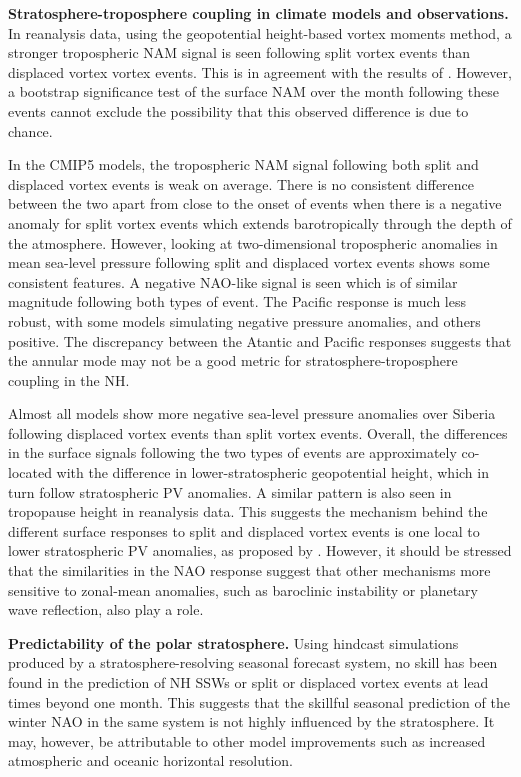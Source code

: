\bigskip\noindent\textbf{Stratosphere-troposphere coupling in climate models and
  observations.}  In reanalysis data, using the geopotential height-based vortex
moments method, a stronger tropospheric NAM signal is seen following split
vortex events than displaced vortex vortex events. This is in agreement with the
results of \citet{Mitchell2013}. However, a bootstrap significance test of the
surface NAM over the month following these events cannot exclude the possibility
that this observed difference is due to chance.

In the CMIP5 models, the tropospheric NAM signal following both split and
displaced vortex events is weak on average. There is no consistent difference
between the two apart from close to the onset of events when there is a negative
anomaly for split vortex events which extends barotropically through the depth
of the atmosphere. However, looking at two-dimensional tropospheric anomalies in
mean sea-level pressure following split and displaced vortex events shows some
consistent features. A negative NAO-like signal is seen which is of similar
magnitude following both types of event. The Pacific response is much less
robust, with some models simulating negative pressure anomalies, and others
positive. The discrepancy between the Atantic and Pacific responses suggests
that the annular mode may not be a good metric for stratosphere-troposphere
coupling in the NH.

Almost all models show more negative sea-level pressure anomalies over Siberia
following displaced vortex events than split vortex events. Overall, the
differences in the surface signals following the two types of events are
approximately co-located with the difference in lower-stratospheric geopotential
height, which in turn follow stratospheric PV anomalies. A similar pattern is
also seen in tropopause height in reanalysis data. This suggests the mechanism
behind the different surface responses to split and displaced vortex events is
one local to lower stratospheric PV anomalies, as proposed by
\citet{Ambaum2002}. However, it should be stressed that the similarities in the
NAO response suggest that other mechanisms more sensitive to zonal-mean
anomalies, such as baroclinic instability or planetary wave reflection, also
play a role.

\bigskip\noindent\textbf{Predictability of the polar stratosphere.} Using
hindcast simulations produced by a stratosphere-resolving seasonal forecast
system, no skill has been found in the prediction of NH SSWs or split or
displaced vortex events at lead times beyond one month. This suggests that the
skillful seasonal prediction of the winter NAO in the same system
\citep{Scaife2013} is not highly influenced by the stratosphere. It may,
however, be attributable to other model improvements such as increased
atmospheric and oceanic horizontal resolution.

